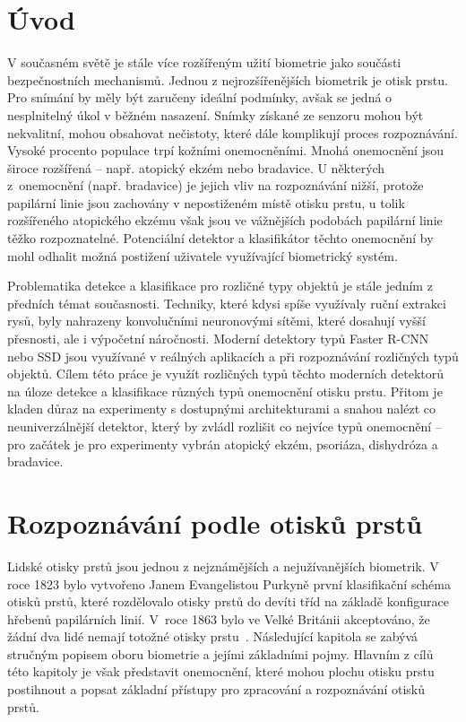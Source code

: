 
\chapter{Úvod}
V současném světě je stále více rozšířeným užití biometrie jako součásti bezpečnostních mechanismů. Jednou z nejrozšířenějších biometrik je otisk prstu. Pro snímání by měly být zaručeny ideální podmínky, avšak se jedná o nesplnitelný úkol v běžném nasazení. Snímky získané ze senzoru mohou být nekvalitní, mohou obsahovat nečistoty, které dále komplikují proces rozpoznávání. Vysoké procento populace trpí kožními onemocněními. Mnohá onemocnění jsou široce rozšířená -- např. atopický ekzém nebo bradavice. U některých z~onemocnění (např. bradavice) je jejich vliv na rozpoznávání nižší, protože papilární linie jsou zachovány v nepostiženém místě otisku prstu, u tolik rozšířeného atopického ekzému však jsou ve vážnějších podobách papilární linie těžko rozpoznatelné. Potenciální detektor a klasifikátor těchto onemocnění by mohl odhalit možná postižení uživatele využívající biometrický systém.

Problematika detekce a klasifikace pro rozličné typy objektů je stále jedním z předních témat současnosti. Techniky, které kdysi spíše využívaly ruční extrakci rysů, byly nahrazeny konvolučními neuronovými sítěmi, které dosahují vyšší přesnosti, ale i výpočetní náročnosti. Moderní detektory typů Faster R-CNN nebo SSD jsou využívané v reálných aplikacích a při rozpoznávání rozličných typů objektů. Cílem této práce je využít rozličných typů těchto moderních detektorů na úloze detekce a klasifikace různých typů onemocnění otisku prstu. Přitom je kladen důraz na experimenty s dostupnými architekturami a snahou nalézt co neuniverzálnější detektor, který by zvládl rozlišit co nejvíce typů onemocnění -- pro začátek je pro experimenty vybrán atopický ekzém, psoriáza, dishydróza a bradavice.
\chapter{Rozpoznávání podle otisků prstů}
Lidské otisky prstů jsou jednou z nejznámějších a nejužívanějších biometrik. V roce 1823 bylo vytvořeno Janem Evangelistou Purkyně první klasifikační schéma otisků prstů, které rozdělovalo otisky prstů do devíti tříd na základě konfigurace hřebenů papilárních linií. V~roce 1863 bylo ve Velké Británii akceptováno, že žádní dva lidé nemají totožné otisky prstu~\cite{Maltoni2009}. Následující kapitola se zabývá stručným popisem oboru biometrie a jejími základními pojmy. Hlavním z cílů této kapitoly je však představit onemocnění, které mohou plochu otisku prstu postihnout a popsat základní přístupy pro zpracování a rozpoznávání otisků prstů.
